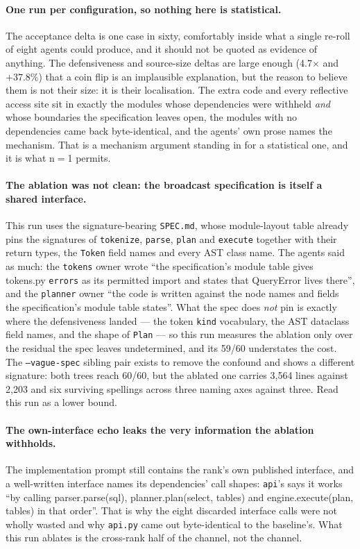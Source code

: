\documentclass[11pt]{article}
\begin{document}
\paragraph{One run per configuration, so nothing here is statistical.} The acceptance delta is one
case in sixty, comfortably inside what a single re-roll of eight agents could produce, and it
should not be quoted as evidence of anything. The defensiveness and source-size deltas are large
enough (4.7$\times$ and $+37.8$\%) that a coin flip is an implausible explanation, but the reason to
believe them is not their size: it is their localisation. The extra code and every reflective access
site sit in exactly the modules whose dependencies were withheld \emph{and} whose boundaries the
specification leaves open, the modules with no dependencies came back byte-identical, and the
agents' own prose names the mechanism. That is a mechanism argument standing in for a statistical
one, and it is what n$=$1 permits.

\paragraph{The ablation was not clean: the broadcast specification is itself a shared interface.}
This run uses the signature-bearing \texttt{SPEC.md}, whose module-layout table already pins the
signatures of \texttt{tokenize}, \texttt{parse}, \texttt{plan} and \texttt{execute} together with
their return types, the \texttt{Token} field names and every
AST class name. The agents said as much: the \texttt{tokens} owner wrote ``the specification's
module table gives tokens.py \texttt{errors} as its permitted import and states that QueryError
lives there'', and the \texttt{planner} owner ``the code is written against the node names and
fields the specification's module table states''. What the spec does \emph{not} pin is exactly where
the defensiveness landed --- the token \texttt{kind} vocabulary, the AST dataclass field names, and
the shape of \texttt{Plan} --- so this run measures the ablation only over the residual the spec
leaves undetermined, and its 59/60 understates the cost. The \texttt{--vague-spec} sibling pair
exists to remove the confound and shows a different signature: both trees reach 60/60, but the
ablated one carries 3{,}564 lines against 2{,}203 and six surviving spellings across three naming
axes against three. Read this run as a lower bound.

\paragraph{The own-interface echo leaks the very information the ablation withholds.} The
implementation prompt still contains the rank's own published interface, and a well-written
interface names its dependencies' call shapes: \texttt{api}'s says it works ``by calling
parser.parse(sql), planner.plan(select, tables) and engine.execute(plan, tables) in that order''.
That is why the eight discarded interface calls were not wholly wasted and why \texttt{api.py} came
out byte-identical to the baseline's. What this run ablates is the cross-rank half of the channel,
not the channel.
\end{document}
